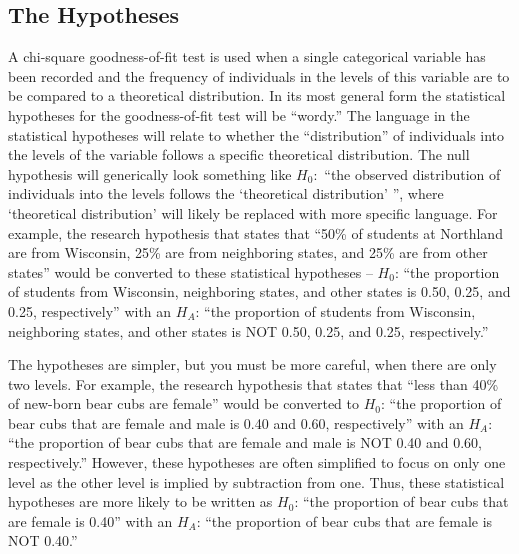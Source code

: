 \documentclass[10pt,openany]{book}\usepackage[]{graphicx}\usepackage[]{color}
\begin{document}
\subsection{The Hypotheses}
A chi-square goodness-of-fit test is used when a single categorical variable has been recorded and the frequency of individuals in the levels of this variable are to be compared to a theoretical distribution.  In its most general form the statistical hypotheses for the goodness-of-fit test will be ``wordy.''  The language in the statistical hypotheses will relate to whether the ``distribution'' of individuals into the levels of the variable follows a specific theoretical distribution.  The null hypothesis will generically look something like $H_{0}:$ ``the observed distribution of individuals into the levels follows the `theoretical distribution' '', where `theoretical distribution' will likely be replaced with more specific language.  For example, the research hypothesis that states that ``50\% of students at Northland are from Wisconsin, 25\% are from neighboring states, and 25\% are from other states'' would be converted to these statistical hypotheses -- $H_{0}$: ``the proportion of students from Wisconsin, neighboring states, and other states is 0.50, 0.25, and 0.25, respectively'' with an $H_{A}$: ``the proportion of students from Wisconsin, neighboring states, and other states is NOT 0.50, 0.25, and 0.25, respectively.''


The hypotheses are simpler, but you must be more careful, when there are only two levels.  For example, the research hypothesis that states that ``less than 40\% of new-born bear cubs are female'' would be converted to $H_{0}$: ``the proportion of bear cubs that are female and male is 0.40 and 0.60, respectively'' with an $H_{A}$: ``the proportion of bear cubs that are female and male is NOT 0.40 and 0.60, respectively.''  However, these hypotheses are often simplified to focus on only one level as the other level is implied by subtraction from one.  Thus, these statistical hypotheses are more likely to be written as $H_{0}$: ``the proportion of bear cubs that are female is 0.40'' with an $H_{A}$: ``the proportion of bear cubs that are female is NOT 0.40.''

\end{document}
